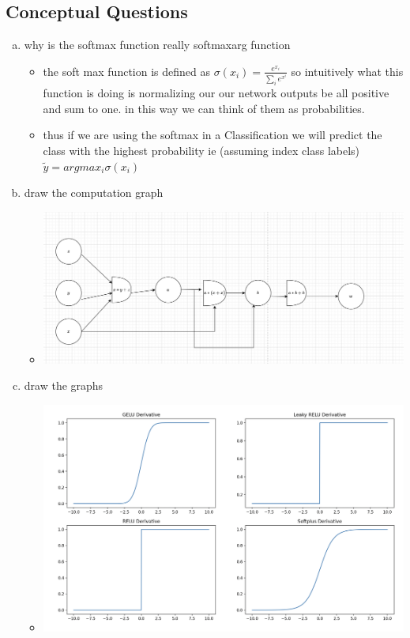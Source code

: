 \documentclass{article}
\begin{document}
\subsection{Conceptual Questions}
\begin{enumerate}[(a)]
    \item why is the softmax function really softmaxarg function
    \begin{itemize}
        \color{blue}
        \item the soft max function is defined as $\sigma(x_i)=\frac{e^{x_i}}{\sum_{i}e^{x^{i}}}$ so intuitively what this function is doing is normalizing our our network outputs be all positive and sum to one. in this way we can think of them as probabilities. 
       \item thus if we are using the softmax in a Classification we will predict the class with the highest probability ie (assuming index class labels) $\tilde{y}=argmax_{i}\sigma(x_i)$
    \end{itemize}
    \item draw the computation graph
    \begin{itemize}
        \color{blue}
        \item \includegraphics[scale=.5]{./figs/question_1_2_b.png}
    \end{itemize}
    \item draw the graphs 
    \begin{itemize}
        \color{blue}
        \item \includegraphics[scale=.3]{./figs/question_1_2_c.png}

\end{itemize}
\end{enumerate}
\end{document}
